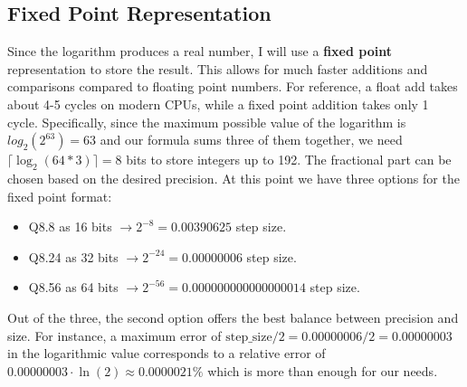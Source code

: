 \documentclass[11pt]{article}
\begin{document}
\subsection{Fixed Point Representation}
Since the logarithm produces a real number, I will use a \textbf{fixed point} representation to store the result. This allows for much faster additions and comparisons compared to floating point numbers. For reference, a float add takes about 4-5 cycles on modern CPUs\textsuperscript{\cite{agner2024}}, while a fixed point addition takes only 1 cycle. Specifically, since the maximum possible value of the logarithm is $log_2(2^{63}) = 63$ and our formula sums three of them together, we need $\lceil \log_2(64 * 3) \rceil = 8$ bits to store integers up to 192. The fractional part can be chosen based on the desired precision. At this point we have three options for the fixed point format:
\begin{itemize}
    \item Q8.8 as 16 bits $\rightarrow 2^{-8} = 0.00390625$ step size.
    \item Q8.24 as 32 bits $\rightarrow 2^{-24} = 0.00000006$ step size.
    \item Q8.56 as 64 bits $\rightarrow 2^{-56} = 0.000000000000000014$ step size.
\end{itemize}
Out of the three, the second option offers the best balance between precision and size. For instance, a maximum error of $\text{step\_size} / 2 = 0.00000006 / 2 = 0.00000003$ in the logarithmic value corresponds to a relative error of $0.00000003 \cdot \ln(2) \approx 0.0000021\%$ which is more than enough for our needs.
\end{document}
